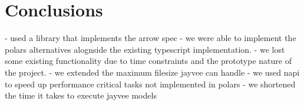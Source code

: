 \chapter{Conclusions}
\label{chapter:Conclusions}

- used a library that implements the arrow spec
- we were able to implement the polars alternatives alognside the existing typescript implementation.
- we lost some existing functionality due to time constraints and the prototype nature of the project.
- we extended the maximum filesize jayvee can handle
- we used napi to speed up performance critical tasks not implemented in polars
- we shortened the time it takes to execute jayvee models

